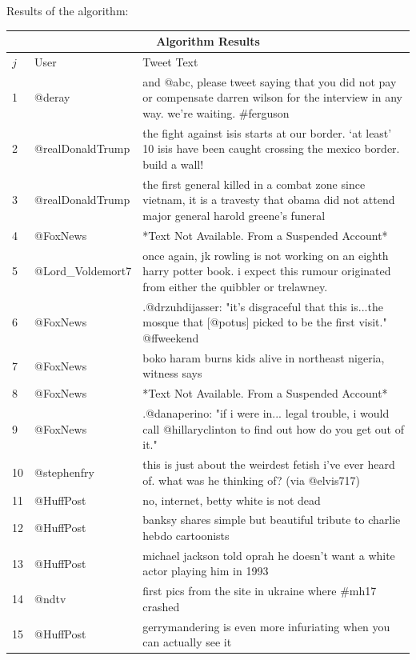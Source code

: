 \documentclass[preprint,review,12pt]{elsarticle}
\begin{document}
Results of the algorithm:
\begin{longtable}{ |p{0.5cm}|p{4.1cm}|p{12cm}|  }
\hline
\multicolumn{3}{|c|}{Algorithm Results} \\
\hline
$j$ & User & Tweet Text \\
\hline
1 & @deray & and @abc, please tweet saying that you did not pay or compensate darren wilson for the interview in any way. we're waiting. \#ferguson\\
\hline
2 & @realDonaldTrump & the fight against isis starts at our border. ‘at least’ 10 isis have been caught crossing the mexico border. build a wall!\\
\hline
3 & @realDonaldTrump & the first general killed in a combat zone since vietnam, it is a travesty that obama did not attend major general harold greene’s funeral\\
\hline
4 & @FoxNews & *Text Not Available. From a Suspended Account*\\
\hline
5 & @Lord\_Voldemort7 & once again, jk rowling is not working on an eighth harry potter book. i expect this rumour originated from either the quibbler or trelawney. \\
\hline
6 & @FoxNews & .@drzuhdijasser: "it's disgraceful that this is...the mosque that [@potus] picked to be the first visit." @ffweekend \\
\hline
7 & @FoxNews & boko haram burns kids alive in northeast nigeria, witness says \\
\hline
8 & @FoxNews & *Text Not Available. From a Suspended Account* \\
\hline
9 & @FoxNews & .@danaperino: "if i were in... legal trouble, i would call @hillaryclinton to find out how do you get out of it." \\
\hline
10 & @stephenfry & this is just about the weirdest fetish i've ever heard of. what was he thinking of? (via @elvis717) \\
\hline
11 & @HuffPost & no, internet, betty white is not dead \\
\hline
12 & @HuffPost & banksy shares simple but beautiful tribute to charlie hebdo cartoonists \\
\hline
13 & @HuffPost & michael jackson told oprah he doesn't want a white actor playing him in 1993\\
\hline
14 & @ndtv & first pics from the site in ukraine where \#mh17 crashed\\
\hline
15 & @HuffPost & gerrymandering is even more infuriating when you can actually see it \\

\end{longtable}
\end{document}
